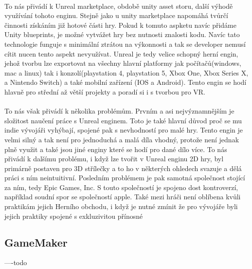 
\paragraph{}
	To nás přivádí k Unreal marketplace, obdobě unity asset storu, další výhodě využívání tohoto enginu.
	Stejně jako u unity marketplace napomáhá tvůrčí činnosti získáním již hotové části hry.
	Pokud k tomuto aspketu navíc přidáme Unity blueprints, je možné vytvážet hry bez nutnosti znalosti kodu.
	Navíc tato technologie funguje s minimální ztrátou na výkonnosti a tak se developer nemusí cítit nucen tento aspekt nevyužívat.
	Unreal je tedy velice schopný herní engin, jehož tvorbu lze exportovat na všechny hlavní platformy jak počítačů(windows, mac a linux)
		tak i konzolí(playstation 4, playstation 5, Xbox One, Xbox Series X, a Nintendo Switch) a také mobilní zařízení (IOS a Android).
	Tento engin se hodí hlavně pro střední až větší projekty a poradí si i s tvorbou pro VR.

\paragraph{}
	To nás však přivádí k několika problémům.
	Prvním a asi nejvýznamnějším je složitost naučení práce s Unreal enginem.
	Toto je také hlavní důvod proč se mu indie vývojáři vyhýbají, spojené pak s nevhodností pro malé hry.
	Tento engin je velmi silný a tak není pro jednoduchá a malá díla vhodný, protože není jednak plně využit a také jsou jiné enginy které se hodí pro dané dílo více.
	To nás přivádí k dalšímu problému, i když lze tvořit v Unreal enginu 2D hry, byl primárně postaven pro 3D střílečky a to ho v některých ohledech svazuje a dělá práci s ním neintuitivní.
	Posledním problémem je pak samotná společnost stojící za ním, tedy Epic Games, Inc.
	S touto společností je spojeno dost kontroverzí, například soudní spor se společností apple\cite{epic_apple_lawsuit}.
	Také mezi hráči není oblíbena kvůli praktikám jejich Herního obchodu, i když je nutné zmínit že pro vývojáře byli jejich praktiky spojené s exkluzivitou přínosné\cite{epic_games_exclusives}

\subsection{GameMaker}
----todo \linebreak
{}

